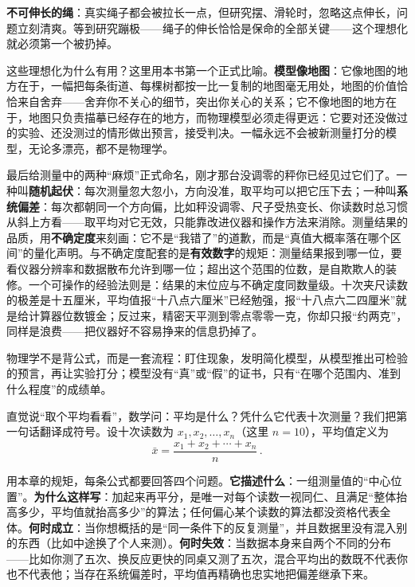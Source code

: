 \textbf{不可伸长的绳}：真实绳子都会被拉长一点，但研究摆、滑轮时，忽略这点伸长，问题立刻清爽。等到研究蹦极——绳子的伸长恰恰是保命的全部关键——这个理想化就必须第一个被扔掉。

这些理想化为什么有用？这里用本书第一个正式比喻。\textbf{模型像地图}：它像地图的地方在于，一幅把每条街道、每棵树都按一比一复制的地图毫无用处，地图的价值恰恰来自舍弃——舍弃你不关心的细节，突出你关心的关系；它不像地图的地方在于，地图只负责描摹已经存在的地方，而物理模型必须走得更远：它要对还没做过的实验、还没测过的情形做出预言，接受判决。一幅永远不会被新测量打分的模型，无论多漂亮，都不是物理学。

最后给测量中的两种“麻烦”正式命名，刚才那台没调零的秤你已经见过它们了。一种叫\textbf{随机起伏}：每次测量忽大忽小，方向没准，取平均可以把它压下去；一种叫\textbf{系统偏差}：每次都朝同一个方向偏，比如秤没调零、尺子受热变长、你读数时总习惯从斜上方看——取平均对它无效，只能靠改进仪器和操作方法来消除。测量结果的品质，用\textbf{不确定度}来刻画：它不是“我错了”的道歉，而是“真值大概率落在哪个区间”的量化声明。与不确定度配套的是\textbf{有效数字}的规矩：测量结果报到哪一位，要看仪器分辨率和数据散布允许到哪一位；超出这个范围的位数，是自欺欺人的装修。一个可操作的经验法则是：结果的末位应与不确定度同数量级。十次夹尺读数的极差是十五厘米，平均值报“十八点六厘米”已经勉强，报“十八点六二四厘米”就是给计算器位数镀金；反过来，精密天平测到零点零零一克，你却只报“约两克”，同样是浪费——把仪器好不容易挣来的信息扔掉了。


\begin{oneline}
物理学不是背公式，而是一套流程：盯住现象，发明简化模型，从模型推出可检验的预言，再让实验打分；模型没有“真”或“假”的证书，只有“在哪个范围内、准到什么程度”的成绩单。
\end{oneline}


直觉说“取个平均看看”，数学问：平均是什么？凭什么它代表十次测量？我们把第一句话翻译成符号。设十次读数为 \(x_1, x_2, \ldots, x_n\)（这里 \(n=10\)），平均值定义为
\[
\bar{x}=\frac{x_1+x_2+\cdots+x_n}{n}\,.
\]

用本章的规矩，每条公式都要回答四个问题。\textbf{它描述什么}：一组测量值的“中心位置”。\textbf{为什么这样写}：加起来再平分，是唯一对每个读数一视同仁、且满足“整体抬高多少，平均值就抬高多少”的算法；任何偏心某个读数的算法都没资格代表全体。\textbf{何时成立}：当你想概括的是“同一条件下的反复测量”，并且数据里没有混入别的东西（比如中途换了个人来测）。\textbf{何时失效}：当数据本身来自两个不同的分布——比如你测了五次、换反应更快的同桌又测了五次，混合平均出的数既不代表你也不代表他；当存在系统偏差时，平均值再精确也忠实地把偏差继承下来。

